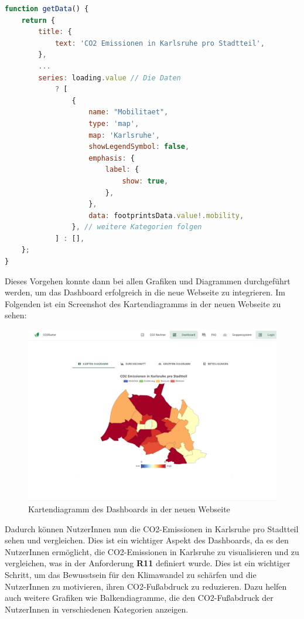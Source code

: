 \begin{lstlisting}[language={JavaScript}, caption={Beispiel Konfiguration für ECharts Diagramme}]
function getData() {
    return {
        title: {
            text: 'CO2 Emissionen in Karlsruhe pro Stadtteil',
        },
        ...
        series: loading.value // Die Daten
            ? [
                {
                    name: "Mobilitaet",
                    type: 'map',
                    map: 'Karlsruhe',
                    showLegendSymbol: false,
                    emphasis: {
                        label: {
                            show: true,
                        },
                    },
                    data: footprintsData.value!.mobility,
                }, // weitere Kategorien folgen
            ] : [],
    };
}
\end{lstlisting}

Dieses Vorgehen konnte dann bei allen Grafiken und Diagrammen durchgeführt werden, um das Dashboard erfolgreich in die neue Webseite zu integrieren. Im Folgenden ist ein Screenshot des Kartendiagramms in der neuen Webseite zu sehen:

\begin{figure}[H]
    \centering
    \includegraphics[width=1\textwidth]{images/06/Dashboard-Design.jpeg}
    \caption{Kartendiagramm des Dashboards in der neuen Webseite}
    \label{fig:new-co2runter-dashboard-design}
\end{figure}

Dadurch können NutzerInnen nun die CO2-Emissionen in Karlsruhe pro Stadtteil sehen und vergleichen. Dies ist ein wichtiger Aspekt des Dashboards, da es den NutzerInnen ermöglicht, die CO2-Emissionen in Karlsruhe zu visualisieren und zu vergleichen, was in der Anforderung \textbf{R11} definiert wurde. Dies ist ein wichtiger Schritt, um das Bewusstsein für den Klimawandel zu schärfen und die NutzerInnen zu motivieren, ihren CO2-Fußabdruck zu reduzieren. Dazu helfen auch weitere Grafiken wie Balkendiagramme, die den CO2-Fußabdruck der NutzerInnen in verschiedenen Kategorien anzeigen.

